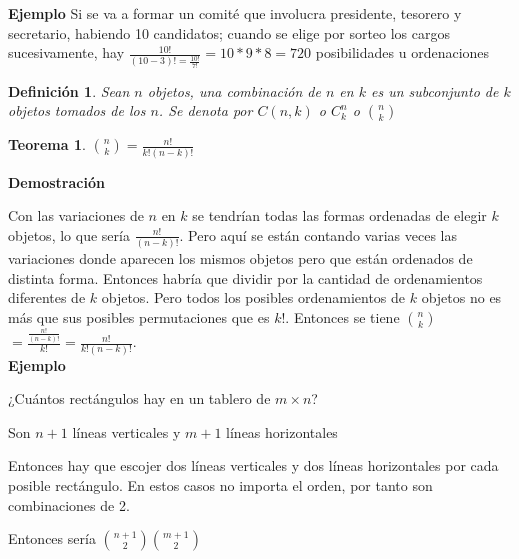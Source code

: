 \documentclass[a4paper,12pt]{report}
\newtheorem*{teo}{Teorema}
\newtheorem*{dfn}{Definición}
\begin{document}
\textbf{Ejemplo}
 Si se va a formar un comité que involucra presidente, tesorero y secretario, habiendo 10 candidatos; cuando se elige por sorteo los cargos sucesivamente, hay $\frac{10!}{(10-3)!=\frac{10!}{7!}}=10*9*8=720$ posibilidades u ordenaciones




\begin{dfn}
 Sean $n$ objetos, una combinación de $n$ en $k$ es un subconjunto de $k$ objetos tomados de los $n$. Se denota por $C(n,k)$ o $C^n_k$ o ${n}\choose{k}$  
\end{dfn}

\begin{teo}
 ${n}\choose{k}$$=\frac{n!}{k!(n-k)!}$  
\end{teo}

\textbf{Demostración}

Con las variaciones de $n$ en $k$ se tendrían todas las formas ordenadas de elegir $k$ objetos, lo que sería 
$\frac{n!}{(n-k)!}$. Pero aquí se están contando varias veces las variaciones donde aparecen los mismos objetos pero que están ordenados de distinta forma. Entonces habría que dividir por la cantidad de ordenamientos diferentes de $k$ objetos. Pero todos los posibles ordenamientos de $k$ objetos no es más que sus posibles permutaciones que es $k!$. 
Entonces se tiene  ${n}\choose{k}$$=\frac{\frac{n!}{(n-k)!}}{k!}=\frac{n!}{k!(n-k)!}$.\\

\textbf{Ejemplo}

¿Cuántos rectángulos hay en un tablero de $m\times n$?

Son $n+1$ líneas verticales y $m+1$ líneas horizontales

Entonces hay que escojer dos líneas verticales y dos líneas horizontales por cada posible rectángulo. En estos casos no importa el orden, por tanto son combinaciones de 2.

Entonces sería ${n+1}\choose{2}$${m+1}\choose{2}$
\end{document}
